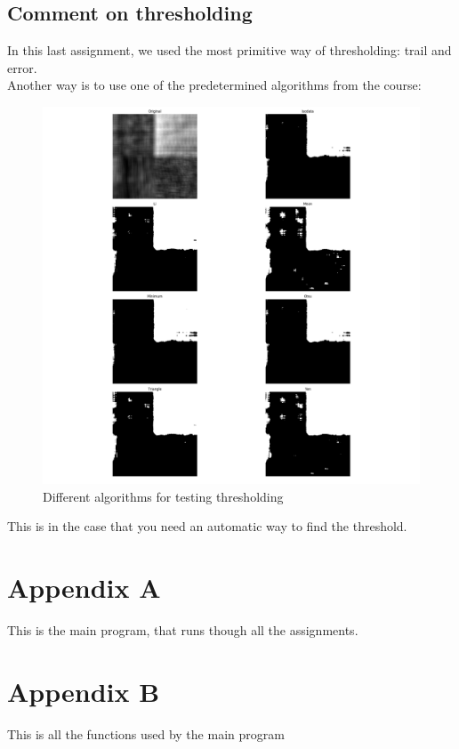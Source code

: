 \documentclass{article}
\begin{document}
\subsection{Comment on thresholding}
	In this last assignment, we used the most primitive way of thresholding: trail and error.\\ 
	Another way is to use one of the predetermined algorithms from the course:
\begin{figure}[h]%
		\includegraphics[scale=0.27]{save4.png}
	    \caption{Different algorithms for testing thresholding}
    	\label{fig:otsuandfriends}%
\end{figure}	
This is in the case that you need an automatic way to find the threshold. 
	 
\section{Appendix A}
This is the main program, that runs though all the assignments.


\section{Appendix B}
This is all the functions used by the main program


	
\end{document}
